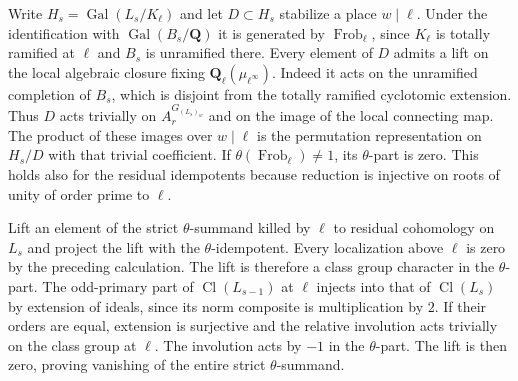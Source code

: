Write \(H_s=\operatorname{Gal}(L_s/K_\ell)\) and let
\(D\subset H_s\) stabilize a place \(w\mid\ell\).
Under the identification with \(\operatorname{Gal}(B_s/\mathbf Q)\)
it is generated by \(\operatorname{Frob}_\ell\), since \(K_\ell\) is
totally ramified at \(\ell\) and \(B_s\) is unramified there.
Every element of \(D\) admits a lift on the local algebraic closure
fixing \(\mathbf Q_\ell(\mu_{\ell^\infty})\). Indeed it acts on the
unramified completion of \(B_s\), which is disjoint from the totally
ramified cyclotomic extension. Thus \(D\) acts trivially on
\(A_r^{G_{(L_s)_w}}\) and on the image of the local connecting map.
The product of these images over \(w\mid\ell\) is the permutation
representation on \(H_s/D\) with that trivial coefficient. If
\(\theta(\operatorname{Frob}_\ell)\ne1\), its \(\theta\)-part is zero.
This holds also for the residual idempotents because reduction is
injective on roots of unity of order prime to \(\ell\).

Lift an element of the strict \(\theta\)-summand killed by \(\ell\) to
residual cohomology on \(L_s\) and project the lift with the
\(\theta\)-idempotent. Every localization above \(\ell\) is zero by
the preceding calculation. The lift is therefore a class group
character in the \(\theta\)-part. The odd-primary part of
\(\operatorname{Cl}(L_{s-1})\) at \(\ell\) injects into that of
\(\operatorname{Cl}(L_s)\) by extension of ideals, since its norm
composite is multiplication by \(2\). If their orders are equal,
extension is surjective and the relative involution acts trivially
on the class group at \(\ell\). The involution acts by \(-1\) in
the \(\theta\)-part. The lift is then zero, proving vanishing of the
entire strict \(\theta\)-summand.


